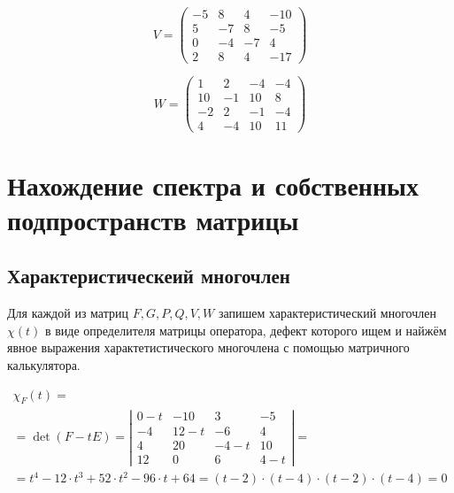 \documentclass[12pt, a4paper]{article}
\begin{document}
\begin{statement}
        \begin{equation}
            V = \left(\begin{matrix}
                -5 & 8 & 4 & -10 \\
                5 & -7 & 8 & -5 \\
                0 & -4 & -7 & 4 \\
                2 & 8 & 4 & -17
            \end{matrix}\right)
        \end{equation}

        
        \begin{equation}
            W = \left(\begin{matrix}
                1 & 2 & -4 & -4 \\
                10 & -1 & 10 & 8 \\
                -2 & 2 & -1 & -4 \\
                4 & -4 & 10 & 11
            \end{matrix}\right)
        \end{equation}
    \end{statement}


    \section{Нахождение спектра и собственных подпространств матрицы}


    \subsection{Характеристическеий многочлен}
    Для каждой из матриц $F, G, P, Q, V, W$ запишем характеристический многочлен $χ(t)$
    в виде определителя матрицы оператора, дефект которого ищем и найжём явное выражения характетистического многочлена 
    с помощью матричного калькулятора.

    \begin{multline}
        \chi_F(t) = \\
        = \det (F-tE) = \left|\begin{matrix}
            0-t & -10 & 3 & -5 \\
            -4 & 12-t & -6 & 4 \\
            4 & 20 & -4-t & 10 \\
            12 & 0 & 6 & 4-t
        \end{matrix}\right| = \\
        = t^4-12 \cdot t^3+52 \cdot t^2-96 \cdot t+64=(t-2) \cdot (t-4) \cdot (t-2) \cdot (t-4)=0
    \end{multline}
\end{document}

